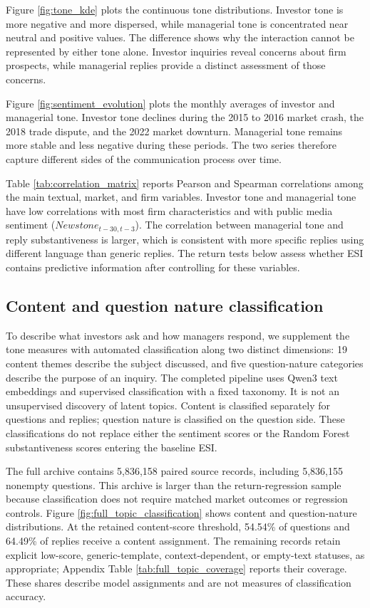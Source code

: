 \documentclass[12pt]{article}
\begin{document}
Figure \ref{fig:tone_kde} plots the continuous tone distributions. Investor tone is more negative and more dispersed, while managerial tone is concentrated near neutral and positive values. The difference shows why the interaction cannot be represented by either tone alone. Investor inquiries reveal concerns about firm prospects, while managerial replies provide a distinct assessment of those concerns.

Figure \ref{fig:sentiment_evolution} plots the monthly averages of investor and managerial tone. Investor tone declines during the 2015 to 2016 market crash, the 2018 trade dispute, and the 2022 market downturn. Managerial tone remains more stable and less negative during these periods. The two series therefore capture different sides of the communication process over time.

Table \ref{tab:correlation_matrix} reports Pearson and Spearman correlations among the main textual, market, and firm variables. Investor tone and managerial tone have low correlations with most firm characteristics and with public media sentiment ($Newstone_{t-30,t-3}$). The correlation between managerial tone and reply substantiveness is larger, which is consistent with more specific replies using different language than generic replies. The return tests below assess whether ESI contains predictive information after controlling for these variables.
\subsection{Content and question nature classification}\label{sec:topic_classification}

To describe what investors ask and how managers respond, we supplement the tone measures with automated classification along two distinct dimensions: 19 content themes describe the subject discussed, and five question-nature categories describe the purpose of an inquiry. The completed pipeline uses Qwen3 text embeddings and supervised classification with a fixed taxonomy. It is not an unsupervised discovery of latent topics. Content is classified separately for questions and replies; question nature is classified on the question side. These classifications do not replace either the sentiment scores or the Random Forest substantiveness scores entering the baseline ESI.

The full archive contains 5,836,158 paired source records, including 5,836,155 nonempty questions. This archive is larger than the return-regression sample because classification does not require matched market outcomes or regression controls. Figure \ref{fig:full_topic_classification} shows content and question-nature distributions. At the retained content-score threshold, 54.54\% of questions and 64.49\% of replies receive a content assignment. The remaining records retain explicit low-score, generic-template, context-dependent, or empty-text statuses, as appropriate; Appendix Table \ref{tab:full_topic_coverage} reports their coverage. These shares describe model assignments and are not measures of classification accuracy.
\end{document}
